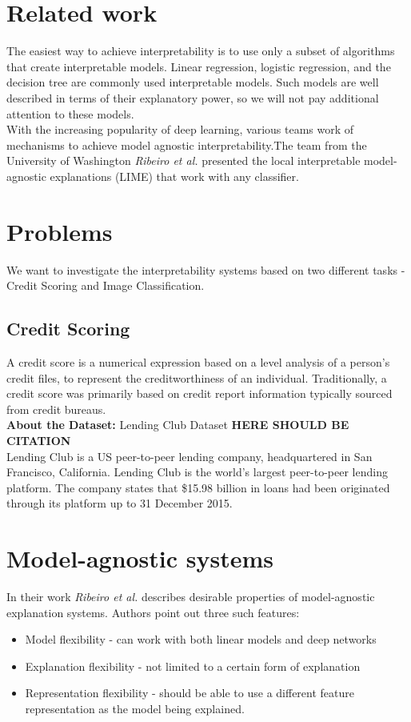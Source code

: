 \section{Related work}
The easiest way to achieve interpretability is to use only a subset of algorithms that create interpretable models. Linear regression, logistic regression, and the decision tree are commonly used interpretable models.\cite{molnar2019}
Such models are well described in terms of their explanatory power, so we will not pay additional attention to these models. \\
With the increasing popularity of deep learning, various teams work of mechanisms to achieve model agnostic interpretability\cite{ribeiro2016model}.The team from the University of Washington \textit{Ribeiro et al.}\cite{RibeiroSG16}  presented the local interpretable model-agnostic explanations (LIME) that work with any classifier. 

\section{Problems}
We want to investigate the interpretability systems based on two different tasks - Credit Scoring and Image Classification. 

\subsection{Credit Scoring}
A credit score is a numerical expression based on a level analysis of a person's credit files, to represent the creditworthiness of an individual. Traditionally, a credit score was primarily based on credit report information typically sourced from credit bureaus. \\
\textbf{About the Dataset:} Lending Club Dataset \textbf{HERE SHOULD BE CITATION}\\
Lending Club is a US peer-to-peer lending company, headquartered in San Francisco, California. Lending Club is the world's largest peer-to-peer lending platform. The company states that \$15.98 billion in loans had been originated through its platform up to 31 December 2015.


\section{Model-agnostic systems}
In their work \textit{Ribeiro et al.}\cite{ribeiro2016model} describes desirable properties of model-agnostic explanation systems. Authors point out three such features:
\begin{itemize}
    \item Model flexibility -  can work with both linear models and deep networks
    \item Explanation flexibility - not limited to a certain form of explanation
    \item Representation flexibility - should be able to use a different feature representation as the model being explained. 
\end{itemize}

